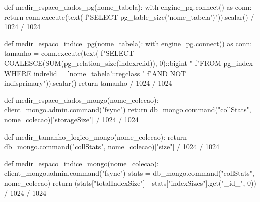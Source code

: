 
\begin{codigo}[language=Python, breaklines=true, caption={Funções de medição de espaço em disco.}, label={lst:medir-espaco}]
def medir_espaco_dados_pg(nome_tabela):
    with engine_pg.connect() as conn:
        return conn.execute(text(
            f"SELECT pg_table_size('{nome_tabela}')")).scalar() / 1024 / 1024

def medir_espaco_indice_pg(nome_tabela):
    with engine_pg.connect() as conn:
        tamanho = conn.execute(text(
            f"SELECT COALESCE(SUM(pg_relation_size(indexrelid)), 0)::bigint "
            f"FROM pg_index WHERE indrelid = '{nome_tabela}'::regclass "
            f"AND NOT indisprimary")).scalar()
    return tamanho / 1024 / 1024

def medir_espaco_dados_mongo(nome_colecao):
    client_mongo.admin.command("fsync")
    return db_mongo.command("collStats", nome_colecao)["storageSize"] / 1024 / 1024

def medir_tamanho_logico_mongo(nome_colecao):
    return db_mongo.command("collStats", nome_colecao)["size"] / 1024 / 1024

def medir_espaco_indice_mongo(nome_colecao):
    client_mongo.admin.command("fsync")
    stats = db_mongo.command("collStats", nome_colecao)
    return (stats["totalIndexSize"] - stats["indexSizes"].get("_id_", 0)) / 1024 / 1024
\end{codigo}
